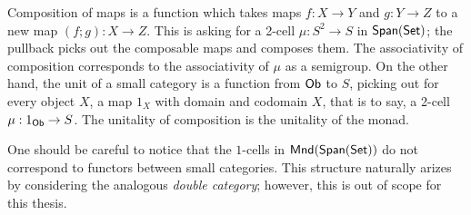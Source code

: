 Composition of maps is a function which takes maps $f:X\to Y$ and $g:Y\to Z$ to a new map $(f;g):X\to Z$.   This is asking for a 2-cell $\mu:S^2\to S$ in $\mathsf{Span}(\mathsf{Set})$; the pullback picks out the composable maps and composes them.  The associativity of composition corresponds to the associativity of $\mu$ as a semigroup.
On the other hand, the unit of a small category is a function from ${\sf Ob}$ to $S$, picking out for every object $X$, a map $1_X$ with domain and codomain $X$, that is to say, a 2-cell $\mu:1_{\sf Ob}\to S$.  The unitality of composition is the unitality of the monad.

One should be careful to notice that the $1$-cells in ${\sf Mnd}(\mathsf{Span}(\mathsf{Set}))$ do not correspond to functors between small categories.  This structure naturally arizes by considering the analogous {\em double category}; however, this is out of scope for this thesis.


